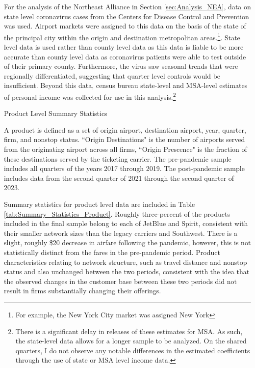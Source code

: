 \documentclass{article}
\begin{document}
	For the analysis of the Northeast Alliance in Section \ref{sec:Analysis_NEA}, data on state level coronavirus cases from the Centers for Disease Control and Prevention was used. Airport markets were assigned to this data on the basis of the state of the principal city within the origin and destination metropolitan areas.\footnote{For example, the New York City market was assigned New York}. State level data is used rather than county level data as this data is liable to be more accurate than county level data as coronavirus patients were able to test outside of their primary county. Furthermore, the virus saw seasonal trends that were regionally differentiated, suggesting that quarter level controls would be insufficient. Beyond this data, census bureau state-level and MSA-level estimates of personal income was collected for use in this analysis.\footnote{There is a significant delay in releases of these estimates for MSA. As such, the state-level data allows for a longer sample to be analyzed. On the shared quarters, I do not observe any notable differences in the estimated coefficients through the use of state or MSA level income data.}

    \begin{table}
    \caption{Product Level Summary Statistics}
    \label{tab:Summary_Statistics_Product}
    
    \footnotesize{A product is defined as a set of origin airport, destination airport, year, quarter, firm, and nonstop status. ``Origin Destinations" is the number of airports served from the originating airport across all firms, ``Origin Prescence" is the fraction of these destinations served by the ticketing carrier. The pre-pandemic sample includes all quarters of the years 2017 through 2019. The post-pandemic sample includes data from the second quarter of 2021 through the second quarter of 2023.}
    \end{table}

    Summary statistics for product level data are included in Table \ref{tab:Summary_Statistics_Product}. Roughly three-percent of the products included in the final sample belong to each of JetBlue and Spirit, consistent with their smaller network sizes than the legacy carriers and Southwest. There is a slight, roughly \$20 decrease in airfare following the pandemic, however, this is not statistically distinct from the fares in the pre-pandemic period. Product characteristics relating to network structure, such as travel distance and nonstop status and also unchanged between the two periods, consistent with the idea that the observed changes in the customer base between these two periods did not result in firms substantially changing their offerings.  
\end{document}

